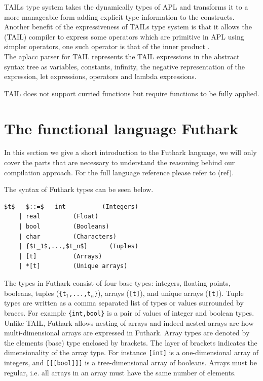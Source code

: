 \documentclass[11pt]{article}
\begin{document}
 TAILs type system takes the dynamically types of APL and transforms it to a more manageable form adding explicit type
 information to the constructs.
Another benefit of the expressiveness of TAILs type system is that it allows the (TAIL) compiler to express some operators which
are primitive in APL using simpler operators, one such operator is that of the inner product \cite{ElsmanDybdal:Array:2014}. \\

The aplacc parser for TAIL represents the TAIL expressions in the abstract syntax tree as variables, constants, infinity, the negative representation of 
the expression, let expressions, operators and lambda expressions. 


TAIL does not support curried functions but require functions to be fully applied.



\section{The functional language Futhark}
\label{sec:futhark}

In this section we give a short introduction to the Futhark language, we will only cover the parts that are necessary to understand
the reasoning behind our compilation approach. For the full language reference please refer to (ref).

The syntax of Futhark types can be seen below.
\begin{lstlisting}[numbers=none,frame=none]
$t$   $::=$   int          (Integers)
    | real         (Float)
    | bool         (Booleans)
    | char         (Characters)
    | {$t_1$,...,$t_n$}      (Tuples)
    | [t]          (Arrays)
    | *[t]         (Unique arrays)
\end{lstlisting}
The types in Futhark consist of four base types: integers, floating points, booleans, tuples ({\tt \{t$_1$,...,t$_n$\}}), arrays ({\tt [t]}), and unique arrays ({\tt *[t]}).
Tuple types are written as a comma separated list of types or values surrounded by braces. For example {\tt\{int,bool\}} is 
a pair of values of integer and boolean types.
Unlike TAIL, Futhark allows nesting of arrays and indeed nested arrays are how multi-dimensional arrays are expressed in Futhark.
Array types are denoted by the elements (base) type enclosed by brackets.
The layer of brackets indicates the dimensionality of the array type.
For instance {\tt [int]} is a one-dimensional array of integers, and {\tt [[[bool]]]} is a tree-dimensional array of booleans.
Arrays must be regular, i.e. all arrays in an array must have the same number of elements. \\
\end{document}
